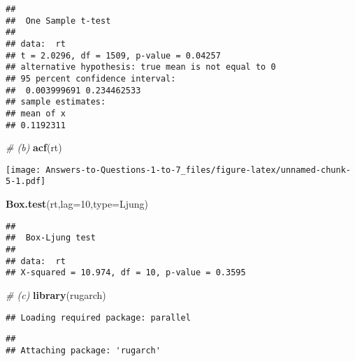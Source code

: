 \documentclass[
]{article}
\newenvironment{Shaded}{\begin{snugshade}}{\end{snugshade}}
\newcommand{\AttributeTok}[1]{\textcolor[rgb]{0.13,0.29,0.53}{#1}}
\newcommand{\CommentTok}[1]{\textcolor[rgb]{0.56,0.35,0.01}{\textit{#1}}}
\newcommand{\DecValTok}[1]{\textcolor[rgb]{0.00,0.00,0.81}{#1}}
\newcommand{\FunctionTok}[1]{\textcolor[rgb]{0.13,0.29,0.53}{\textbf{#1}}}
\newcommand{\NormalTok}[1]{#1}
\newcommand{\OtherTok}[1]{\textcolor[rgb]{0.56,0.35,0.01}{#1}}
\newcommand{\SpecialCharTok}[1]{\textcolor[rgb]{0.81,0.36,0.00}{\textbf{#1}}}
\newcommand{\StringTok}[1]{\textcolor[rgb]{0.31,0.60,0.02}{#1}}
\begin{document}
\begin{Shaded}
\end{Shaded}

\begin{verbatim}
## 
##  One Sample t-test
## 
## data:  rt
## t = 2.0296, df = 1509, p-value = 0.04257
## alternative hypothesis: true mean is not equal to 0
## 95 percent confidence interval:
##  0.003999691 0.234462533
## sample estimates:
## mean of x 
## 0.1192311
\end{verbatim}

\begin{Shaded}
\begin{Highlighting}[]
\CommentTok{\# (b)}
\FunctionTok{acf}\NormalTok{(rt)}
\end{Highlighting}
\end{Shaded}

\texttt{[image: Answers-to-Questions-1-to-7\_files/figure-latex/unnamed-chunk-5-1.pdf]}

\begin{Shaded}
\begin{Highlighting}[]
\FunctionTok{Box.test}\NormalTok{(rt,}\AttributeTok{lag=}\DecValTok{10}\NormalTok{,}\AttributeTok{type=}\StringTok{\textquotesingle{}Ljung\textquotesingle{}}\NormalTok{)}
\end{Highlighting}
\end{Shaded}

\begin{verbatim}
## 
##  Box-Ljung test
## 
## data:  rt
## X-squared = 10.974, df = 10, p-value = 0.3595
\end{verbatim}

\begin{Shaded}
\begin{Highlighting}[]
\CommentTok{\# (c)}
\FunctionTok{library}\NormalTok{(rugarch)}
\end{Highlighting}
\end{Shaded}

\begin{verbatim}
## Loading required package: parallel
\end{verbatim}

\begin{verbatim}
## 
## Attaching package: 'rugarch'
\end{verbatim}
\end{document}
